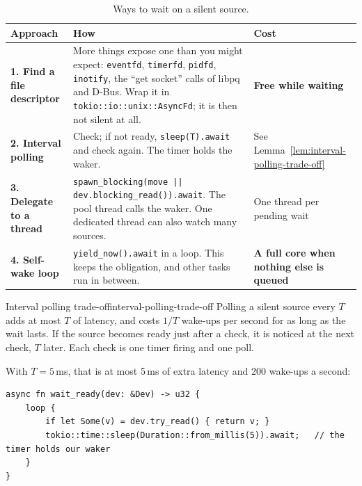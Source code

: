 \begin{table}[htbp]
    \centering\small
    \begin{tabularx}{\linewidth}{>{\raggedright\arraybackslash}p{3.4cm} Y >{\raggedright\arraybackslash}p{3.2cm}}
        \toprule
        \textbf{Approach} & \textbf{How} & \textbf{Cost} \\
        \midrule
        \textbf{1. Find a file descriptor} & More things expose one than you might expect: \texttt{eventfd}, \texttt{timerfd}, \texttt{pidfd}, \texttt{inotify}, the ``get socket'' calls of libpq and D-Bus. Wrap it in \texttt{tokio::io::unix::AsyncFd}; it is then not silent at all. & \textcolor{StmtLemma}{\textbf{Free while waiting}} \\
        \textbf{2. Interval polling} & Check; if not ready, \texttt{sleep(T).await} and check again. The timer holds the waker. & See Lemma~\ref{lem:interval-polling-trade-off} \\
        \textbf{3. Delegate to a thread} & \texttt{spawn\_blocking(move || dev.blocking\_read()).await}. The pool thread calls the waker. One dedicated thread can also watch many sources. & One thread per pending wait \\
        \textbf{4. Self-wake loop} & \texttt{yield\_now().await} in a loop. This keeps the obligation, and other tasks run in between. & \textcolor{red!70!black}{\textbf{A full core when nothing else is queued}} \\
        \bottomrule
    \end{tabularx}
    \caption{Ways to wait on a silent source.}
    \label{tab:wakers-9.1}
\end{table}

\begin{lemma}{Interval polling trade-off}{interval-polling-trade-off}
    Polling a silent source every $T$ adds at most $T$ of latency, and costs $1/T$ wake-ups per second for as long as the wait lasts.
    \why If the source becomes ready just after a check, it is noticed at the next check, $T$ later. Each check is one timer firing and one poll.
\end{lemma}

With $T = 5$\,ms, that is at most 5\,ms of extra latency and 200 wake-ups a second:

\begin{lstlisting}[caption={Interval polling: the timer is the waker.}, label=lst:wakers-9.1]
async fn wait_ready(dev: &Dev) -> u32 {
    loop {
        if let Some(v) = dev.try_read() { return v; }
        tokio::time::sleep(Duration::from_millis(5)).await;   // the timer holds our waker
    }
}
\end{lstlisting}

